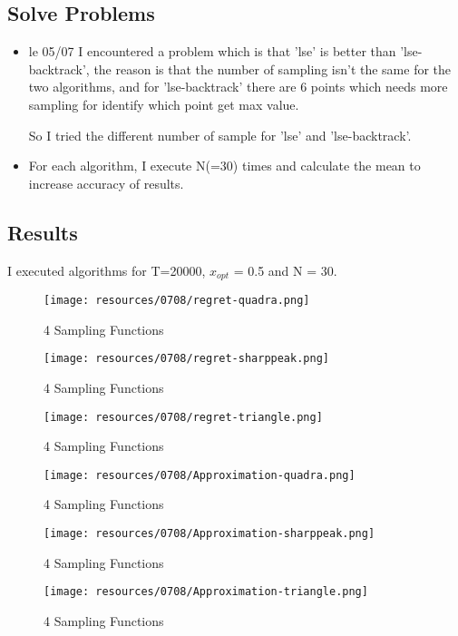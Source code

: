 \subsection*{Solve Problems}
\begin{itemize}
	\item le 05/07 I encountered a problem which is that 'lse' is better than 'lse-backtrack', the reason is that the number of sampling isn't the same for the two algorithms, and for 'lse-backtrack' there are 6 points which needs more sampling for identify which point get max value.
	
	So I tried the different number of sample for 'lse' and 'lse-backtrack'.
	
	\item For each algorithm, I execute N(=30) times and calculate the mean to increase accuracy of results.

\end{itemize}

\subsection*{Results}
I executed algorithms for T=20000, $x_{opt}$ = 0.5 and N = 30.

	\begin{figure}[h]
	\center
	\texttt{[image: resources/0708/regret-quadra.png]}
	\caption{4 Sampling Functions}
	\label{unimodal-0705-approx-quadra}
	\end{figure}

	\begin{figure}[h]
	\center
	\texttt{[image: resources/0708/regret-sharppeak.png]}
	\caption{4 Sampling Functions}
	\label{unimodal-0705-approx-quadra}
	\end{figure}
	
	\begin{figure}[h]
	\center
	\texttt{[image: resources/0708/regret-triangle.png]}
	\caption{4 Sampling Functions}
	\label{unimodal-0705-approx-quadra}
	\end{figure}	

	\begin{figure}[h]
	\center
	\texttt{[image: resources/0708/Approximation-quadra.png]}
	\caption{4 Sampling Functions}
	\label{unimodal-0705-approx-quadra}
	\end{figure}

	\begin{figure}[h]
	\center
	\texttt{[image: resources/0708/Approximation-sharppeak.png]}
	\caption{4 Sampling Functions}
	\label{unimodal-0705-approx-quadra}
	\end{figure}
	
	\begin{figure}[h]
	\center
	\texttt{[image: resources/0708/Approximation-triangle.png]}
	\caption{4 Sampling Functions}
	\label{unimodal-0705-approx-quadra}
	\end{figure}	